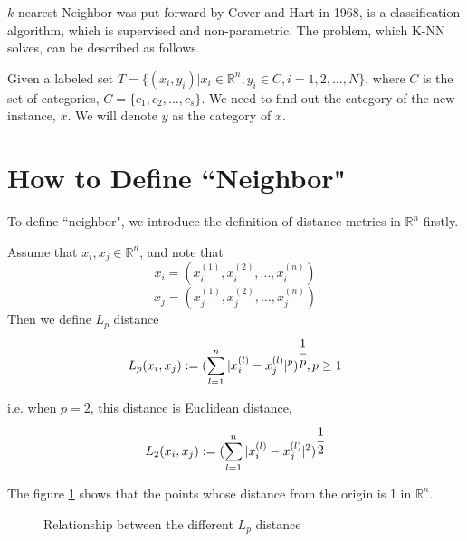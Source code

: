 $k$-nearest Neighbor was put forward by Cover and Hart in 1968\cite{knn}, is a classification algorithm, which is supervised and non-parametric. The problem, which K-NN solves, can be described as follows.

	  Given a labeled set $T=\{(x_i,y_i)|x_i\in\mathbb{R}^n, y_i\in C, i=1,2,\dots,N\}$, where $C$ is the set of categories, $C=\{c_1,c_2,\dots,c_s\}$. We need to find out the category of the new instance, $x$. We will denote $y$ as the category of $x$.


\section{How to Define ``Neighbor"}
	To define ``neighbor", we introduce the definition of distance metrics in $\mathbb{R}^n$ firstly.

	\begin{definition}
	Assume that $x_i, x_j\in\mathbb{R}^n$, and note that
	$$x_i=(x_i^{(1)},x_i^{(2)},\dots,x_i^{(n)})$$
		$$x_j=(x_j^{(1)},x_j^{(2)},\dots,x_j^{(n)})$$
		Then we define $L_p$ distance
		\begin{equation}
		L_p(x_i, x_j):=(\sum_{l=1}^{n} |x_i^{(l)}-x_j^{(l)}|^p)^{\cfrac{1}{p}}, p\geq 1
		\end{equation}

		i.e. when $p=2$, this distance is Euclidean distance,
		\begin{equation}
		L_2(x_i, x_j):=(\sum_{l=1}^{n} |x_i^{(l)}-x_j^{(l)}|^2)^{\cfrac{1}{2}}
		\end{equation}


         \end{definition}

	    The figure \ref{alo:distance} shows that the points whose distance from the origin is 1 in $\mathbb{R}^n$.
	    \begin{figure}[htbp]
	    	\caption{Relationship between the different $L_p$ distance}
	    	\label{alo:distance}
	    \end{figure}

